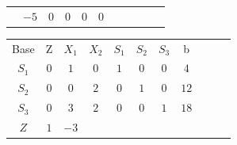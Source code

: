 \begin{frame}
{\begin{table}
\begin{tabular}{c c c c c c c c c c c}
				& \cellcolor{yellow!50} $\scriptstyle -5$
				& \cellcolor{yellow!50} $\scriptstyle 0$
				& \cellcolor{yellow!50} $\scriptstyle 0$
				& \cellcolor{yellow!50} $\scriptstyle 0$
				& \cellcolor{yellow!50} $\scriptstyle 0$ 
				&
				&
				& \\
				\cline{1-8}
			\end{tabular}
		\end{table}			
	}	
	{		
		\begin{table}		
			\begin{tabular}{c c c c c c c c c c c}
				\cline{1-8} 
				\cellcolor{blue!100} \color{white} \scriptsize Base 
				&\cellcolor{blue!100} \color{white} \scriptsize Z 
				&\cellcolor{blue!100} \color{white} $\scriptstyle X_1$ 
				&\cellcolor{blue!100} \color{white} $\scriptstyle X_2$ 
				&\cellcolor{blue!100} \color{red} $\scriptstyle S_1$ 
				&\cellcolor{blue!100} \color{red} $\scriptstyle S_2$ 
				&\cellcolor{blue!100} \color{red} $\scriptstyle S_3$ 
				&\cellcolor{blue!100} \color{white} \scriptsize b
				&
				&
				& \\
				\cline{1-8}
				\cellcolor{blue!100} \color{red} $\scriptstyle S_1$
				& \cellcolor{yellow!50} $\scriptstyle 0$
				& \cellcolor{yellow!50} $\scriptstyle 1$
				& \cellcolor{gray!50} $\scriptstyle 0$
				& \cellcolor{yellow!50} $\scriptstyle 1$
				& \cellcolor{yellow!50} $\scriptstyle 0$
				& \cellcolor{yellow!50} $\scriptstyle 0$
				& \cellcolor{yellow!50} $\scriptstyle 4$
				&
				&
				& \\
				\cline{1-8} 
				\cellcolor{blue!100} \color{red} $\scriptstyle S_2$
				& \cellcolor{yellow!50} $\scriptstyle 0$
				& \cellcolor{yellow!50} $\scriptstyle 0$
				& \cellcolor{gray!50} $\scriptstyle 2$
				& \cellcolor{yellow!50} $\scriptstyle 0$			
				& \cellcolor{yellow!50} $\scriptstyle 1$
				& \cellcolor{yellow!50} $\scriptstyle 0$
				& \cellcolor{yellow!50} $\scriptstyle 12$
				&
				&
				& \\
				\cline{1-8} 
				\cellcolor{blue!100} \color{red} $\scriptstyle S_3$
				& \cellcolor{yellow!50} $\scriptstyle 0$
				& \cellcolor{yellow!50} $\scriptstyle 3$
				& \cellcolor{gray!50} $\scriptstyle 2$
				& \cellcolor{yellow!50} $\scriptstyle 0$
				& \cellcolor{yellow!50} $\scriptstyle 0$
				& \cellcolor{yellow!50} $\scriptstyle 1$
				& \cellcolor{yellow!50} $\scriptstyle 18$
				&
				&
				& \\
				\cline{1-8}
				\cellcolor{blue!100} \color{white} $\scriptstyle Z$
				& \cellcolor{yellow!50} $\scriptstyle 1$
				& \cellcolor{yellow!50} $\scriptstyle -3$

\end{tabular}
\end{table}}
\end{frame}
